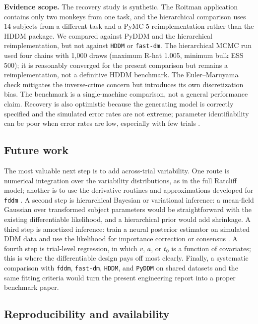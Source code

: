 \documentclass[11pt]{article}
\begin{document}
\textbf{Evidence scope.} The recovery study is synthetic.  The Roitman application contains only two monkeys from one task, and the hierarchical comparison uses 14 subjects from a different task and a PyMC 5 reimplementation rather than the HDDM package.  We compared against PyDDM and the hierarchical reimplementation, but not against \texttt{HDDM} or \texttt{fast-dm}.  The hierarchical MCMC run used four chains with 1,000 draws (maximum R-hat 1.005, minimum bulk ESS 500); it is reasonably converged for the present comparison but remains a reimplementation, not a definitive HDDM benchmark.  The Euler--Maruyama check mitigates the inverse-crime concern but introduces its own discretization bias.  The benchmark is a single-machine comparison, not a general performance claim.  Recovery is also optimistic because the generating model is correctly specified and the simulated error rates are not extreme; parameter identifiability can be poor when error rates are low, especially with few trials \citep{Lucken2025}.

\subsection{Future work}

The most valuable next step is to add across-trial variability. One route is numerical integration over the variability distributions, as in the full Ratcliff model; another is to use the derivative routines and approximations developed for \texttt{fddm} \citep{FosterSingmann2024,Blurton2017}. A second step is hierarchical Bayesian or variational inference: a mean-field Gaussian over transformed subject parameters would be straightforward with the existing differentiable likelihood, and a hierarchical prior would add shrinkage. A third step is amortized inference: train a neural posterior estimator on simulated DDM data and use the likelihood for importance correction or consensus \citep{Wu2026}. A fourth step is trial-level regression, in which $v$, $a$, or $t_0$ is a function of covariates; this is where the differentiable design pays off most clearly. Finally, a systematic comparison with \texttt{fddm}, \texttt{fast-dm}, \texttt{HDDM}, and \texttt{PyDDM} on shared datasets and the same fitting criteria would turn the present engineering report into a proper benchmark paper.

\subsection{Reproducibility and availability}
\end{document}
